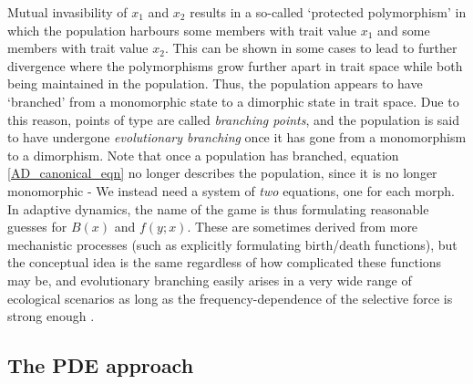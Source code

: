 Mutual invasibility of $x_1$ and $x_2$ results in a so-called `protected polymorphism' in which the population harbours some members with trait value $x_1$ and some members with trait value $x_2$. This can be shown in some cases to lead to further divergence where the polymorphisms grow further apart in trait space while both being maintained in the population. Thus, the population appears to have `branched' from a monomorphic state to a dimorphic state in trait space. Due to this reason, points of type  are called \emph{branching points}, and the population is said to have undergone \emph{evolutionary branching} once it has gone from a monomorphism to a dimorphism. Note that once a population has branched, equation \eqref{AD_canonical_eqn} no longer describes the population, since it is no longer monomorphic - We instead need a system of \emph{two} equations, one for each morph.\\
In adaptive dynamics, the name of the game is thus formulating reasonable guesses for $B(x)$ and $f(y;x)$. These are sometimes derived from more mechanistic processes (such as explicitly formulating birth/death functions), but the conceptual idea is the same regardless of how complicated these functions may be, and evolutionary branching easily arises in a very wide range of ecological scenarios as long as the frequency-dependence of the selective force is strong enough \citep{doebeli_evolutionary_2000,doebeli_adaptive_2011}.

\subsection{The PDE approach}

